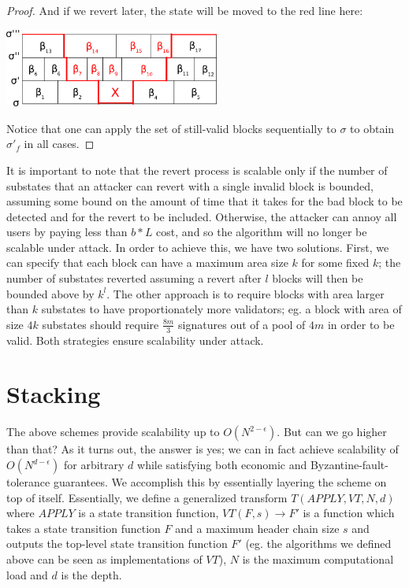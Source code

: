 \documentclass[11pt,a4paper]{report}
\theoremstyle{plain}
\theoremstyle{definition}
\theoremstyle{remark}
\begin{document}
\begin{proof}
And if we revert later, the state will be moved to the red line here:

\begin{center}
\includegraphics[width=200pt]{revert3.png}
\end{center}

Notice that one can apply the set of still-valid blocks sequentially to $\sigma$ to obtain $\sigma'_f$ in all cases.
\end{proof}

It is important to note that the revert process is scalable only if the number of substates that an attacker can revert with a single invalid block is bounded, assuming some bound on the amount of time that it takes for the bad block to be detected and for the revert to be included. Otherwise, the attacker can annoy all users by paying less than $b * L$ cost, and so the algorithm will no longer be scalable under attack. In order to achieve this, we have two solutions. First, we can specify that each block can have a maximum area size $k$ for some fixed $k$; the number of substates reverted assuming a revert after $l$ blocks will then be bounded above by $k^l$. The other approach is to require blocks with area larger than $k$ substates to have proportionately more validators; eg. a block with area of size $4k$ substates should require $\frac{8m}{3}$ signatures out of a pool of $4m$ in order to be valid. Both strategies ensure scalability under attack.

\chapter{Stacking}

The above schemes provide scalability up to $O(N^{2-\epsilon})$. But can we go higher than that? As it turns out, the answer is yes; we can in fact achieve scalability of $O(N^{d-\epsilon})$ for arbitrary $d$ while satisfying both economic and Byzantine-fault-tolerance guarantees. We accomplish this by essentially layering the scheme on top of itself. Essentially, we define a generalized transform $T(APPLY, VT, N, d)$ where $APPLY$ is a state transition function, $VT(F, s) \rightarrow F'$ is a function which takes a state transition function $F$ and a maximum header chain size $s$ and outputs the top-level state transition function $F'$ (eg. the algorithms we defined above can be seen as implementations of $VT$), $N$ is the maximum computational load and $d$ is the depth.
\end{document}
